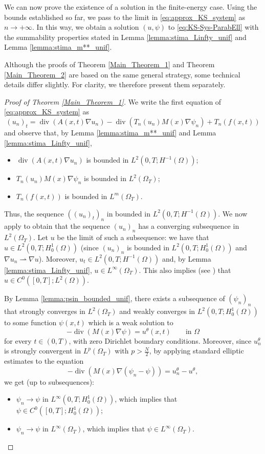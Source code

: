 \documentclass{amsart}
\numberwithin{equation}{section}
\def\elle#1{L^{#1}}
\def\elleom#1{L^{#1}(\Omega)}
\def\elleomT#1{L^{#1}(\Omega_T)}
\def\Hom{H^1_0(\Omega)}
\begin{document}
We can now prove the existence of a solution in the finite-energy case. Using the bounds established so far, we pass to the limit in \eqref{eq:approx_KS_system} as $n\to+\infty$. In this way, we obtain a solution $(u,\psi)$ to \eqref{eq:KS-Sys-ParabEll} with the summability properties stated in Lemma \ref{lemma:stima_Linfty_unif} and Lemma \ref{lemma:stima_m**_unif}.

Although the proofs of Theorem \ref{Main_Theorem_1} and Theorem \ref{Main_Theorem_2} are based on the same general strategy, some technical details differ slightly. For clarity, we therefore present them separately.

\begin{proof}[Proof of Theorem \ref{Main_Theorem_1}]
    We write the first equation of \eqref{eq:approx_KS_system} as
    $$(u_n)_t=\operatorname{div}(A(x, t) \nabla u_n)-\operatorname{div}(T_n(u_n) M(x) \nabla \psi_n)+T_n(f(x,t))$$
    and observe that, by Lemma \ref{lemma:stima_m**_unif} and Lemma \ref{lemma:stima_Linfty_unif},
    \begin{itemize}
        \item $\operatorname{div}(A(x, t) \nabla u_n)$ is bounded in $\elle2(0,T;H^{-1}(\Omega))$;
        \item $T_n(u_n) M(x) \nabla \psi_n$ is bounded in $\elleomT2$;
        \item  $T_n(f(x,t))$ is bounded in $\elleomT m$.
    \end{itemize}
    Thus, the sequence $((u_n)_t)_n$ in bounded in $\elle2(0,T;H^{-1}(\Omega))$.
    We now apply \cite[Corollary 4]{Simon} to obtain that the sequence $(u_n)_n$ has a converging subsequence in $\elleomT2$. Let $u$ be the limit of such a subsequence: we have that $u\in\elle2(0,T;\Hom)$ (since $(u_n)_n$ is bounded in $\elle2(0,T;\Hom)$ and $\nabla u_n\rightharpoonup\nabla u$). Moreover, $u_t\in\elle2(0,T;H^{-1}(\Omega))$ and, by Lemma \ref{lemma:stima_Linfty_unif}, $u\in\elleomT\infty$. This also implies (see \cite[Section 5.9.2]{EvansPDE}) that $u\in C^0([0,T];\elleom2)$.
    
    By Lemma \ref{lemma:psin_bounded_unif}, there exists a subsequence of $(\psi_n)_n$ that strongly converges in $\elleomT2$ and weakly converges in $\elle2(0,T;\Hom)$ to some function $\psi(x,t)$ which is a weak solution to
    \[
    -\operatorname{div}(M(x)\nabla\psi)=u^\theta(x,t)\qquad \text{in }\Omega
    \]
    for every $t\in (0,T)$, with zero Dirichlet boundary conditions.
    Moreover, since $u_n^\theta$ is strongly convergent in $\elleomT p$ with $p>\frac{N}{2}$, by applying standard elliptic estimates \cite{BoccardoCroce} to the equation
    \[
    -\operatorname{div}(M(x)\nabla(\psi_n-\psi))=u_n^\theta-u^\theta,
    \]
    we get (up to subsequences):
    \begin{itemize}
        \item $\psi_n\to\psi$ in $\elle\infty(0,T;\Hom)$, which implies that $\psi\in C^0([0,T];\Hom)$; 
        \item $\psi_n\to\psi$ in $\elle\infty(\Omega_T)$, which implies that $\psi\in \elle\infty(\Omega_T)$.
    \end{itemize}


\end{proof}
\end{document}

